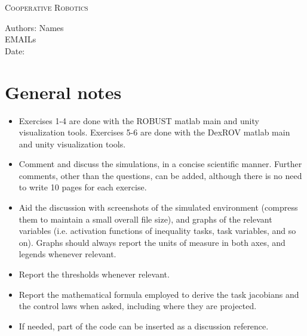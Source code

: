 \documentclass{article}
\makeatletter
\newcommand\frontmatter{%
    \cleardoublepage
  \pagenumbering{roman}}
\newcommand\mainmatter{%
    \cleardoublepage
  \pagenumbering{arabic}}
\makeatother
\begin{document}
\frontmatter
\onecolumn 
\vskip 1cm
\begin{center}
\huge \textsc{Cooperative Robotics}\\
\vskip 1cm

\skip 0.5cm

\vskip 5cm

\normalsize
Authors: Names\\
EMAILs \\
Date:  \\
\end{center}
\clearpage
\mainmatter
\section*{General notes}

\begin{itemize}
	\item Exercises 1-4 are done with the ROBUST matlab main and unity visualization tools. Exercises 5-6 are done with the DexROV matlab main and unity visualization tools.
	\item Comment and discuss the simulations, in a concise scientific manner. Further comments, other than the questions, can be added, although there is no need to write 10 pages for each exercise.
	\item Aid the discussion with screenshots of the simulated environment (compress them to maintain a small overall file size), and graphs of the relevant variables (i.e. activation functions of inequality tasks, task variables, and so on). Graphs should always report the units of measure in both axes, and legends whenever relevant.
	\item Report the thresholds whenever relevant.
	\item Report the mathematical formula employed to derive the task jacobians and the control laws when asked, including where they are projected.
	\item If needed, part of the code can be inserted as a discussion reference.
\end{itemize} 
\end{document}
